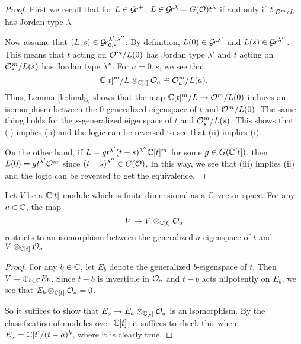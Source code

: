 \documentclass[draft]{article}
\begin{document}
\begin{proof}
First we recall that for $ L \in \mathcal{G}\!r^+$, $ L \in \mathcal{G}\!r^{\lambda} = G(\mathcal O)t^\lambda $ if and only if $ t |_{\mathcal O^m/L} $ has Jordan type $ \lambda$. 

    Now assume that $ (L, s) \in \mathcal{G}\!r^{\lambda', \lambda''}_{0,s}$.  By definition, $ L(0) \in \mathcal{G}\!r^{\lambda'}$ and $L(s) \in \mathcal{G}\!r^{\lambda''} $.  This means that $t $ acting on 
    $\mathcal O^m/L(0)$ has Jordan type $ \lambda'$ and $ t$ acting on 
    $\mathcal O_s^m/L(s)$ has Jordan type $ \lambda''$.  For $ a = 0, s$,  we see that $$\mathbb C[t]^m/L \otimes_{\mathbb C[t]} \mathcal O_a \cong \mathcal O_a^m / L(a). $$
    Thus, Lemma \ref{le:linalg} shows that the map
    $\mathbb C[t]^m/L\to \mathcal O^m/L(0)$ induces an isomorphism between the $0$-generalized eigenspace of $ t$ and $ \mathcal O^m / L(0)$.   The same thing holds for the $s$-generalized eigenspace of $t $ and $ \mathcal O_s^m/L(s)$. This shows that (i) implies (ii) and the logic can be reversed to see that (ii) implies (i). 
    
    On the other hand, if $ L = g t^{\lambda'} (t-s)^{\lambda''} \mathbb C[t]^m$ for some $ g \in G(\mathbb C[t])$, then $ L(0) = g t^{\lambda'}\mathcal O^m $ since 
    $ (t-s)^{\lambda''} \in G(\mathcal O)$. In this way, we see that (iii) implies (ii) and the logic can be reversed to get the equivalence.
\end{proof}

\begin{lemma} \label{le:linalg}
    Let $ V $ be a $ \mathbb C[t]$-module which is finite-dimensional as a $ \mathbb C$ vector space.  For any  $ a \in \mathbb C$, the map
    $$ V  \rightarrow V \otimes_{\mathbb C[t]} \mathcal O_a$$
    restricts to an isomorphism between the generalized $ a $-eigenspace of $ t $ and $ V \otimes_{\mathbb C[t]} \mathcal O_a$
    
    \end{lemma}
    
\begin{proof}
    For any $ b \in \mathbb C$, let $ E_b $ denote the generalized $b$-eigenspace of $t$.  Then $ V = \oplus_{b \in \mathbb C} E_b$.  Since $ t - b$ is invertible in $ \mathcal O_a$ and $ t -b $ acts nilpotently on $ E_b$, we see that $ E_b \otimes_{\mathbb C[t]} \mathcal O_a = 0 $.
    
    So it suffices to show that $ E_a \rightarrow E_a \otimes_{\mathbb C[t]} \mathcal O_a$ is an isomorphism.  By the classification of modules over $ \mathbb C[t]$, it suffices to check this when  $ E_a = \mathbb C[t]/(t-a)^k$, where it is clearly true.
\end{proof}
\end{document}
